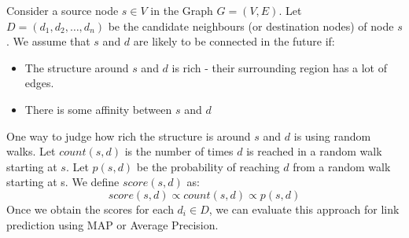 \documentclass{article}
\begin{document}
Consider a source node $s \in V$ in the Graph $ G = (V,E)$. Let $D = (d_1, d_2, \ldots ,d_n)$ be the candidate neighbours (or destination nodes) of node $s$. We assume that $s$ and $d$ are likely to be connected in the future if:
\begin{itemize}
    \item The structure around $s$ and $d$ is rich - their surrounding region has a lot of edges.
    \item There is some affinity between $s$ and $d$
\end{itemize}
One way to judge how rich the structure is around $s$ and $d$ is using random walks. Let $count(s,d)$ is the number of times $d$ is reached in a random walk starting at $s$. Let $p(s,d)$ be the probability of reaching $d$ from a random walk starting at s. We define $score(s,d)$ as:$$
score(s,d) \propto count(s,d) \propto p(s,d)$$
Once we obtain the scores for each $d_i \in D$, we can evaluate this approach for link prediction using MAP or Average Precision.
\end{document}

